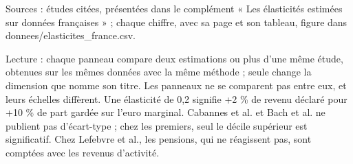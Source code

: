 Sources : études citées, présentées dans le complément « Les élasticités estimées sur données françaises » ; chaque chiffre, avec sa page et son tableau, figure dans donnees/elasticites\_france.csv.\par Lecture : chaque panneau compare deux estimations ou plus d'une même étude, obtenues sur les mêmes données avec la même méthode ; seule change la dimension que nomme son titre. Les panneaux ne se comparent pas entre eux, et leurs échelles diffèrent. Une élasticité de 0,2 signifie +2 \% de revenu déclaré pour +10 \% de part gardée sur l'euro marginal. Cabannes et al. et Bach et al. ne publient pas d'écart-type ; chez les premiers, seul le décile supérieur est significatif. Chez Lefebvre et al., les pensions, qui ne réagissent pas, sont comptées avec les revenus d'activité.
